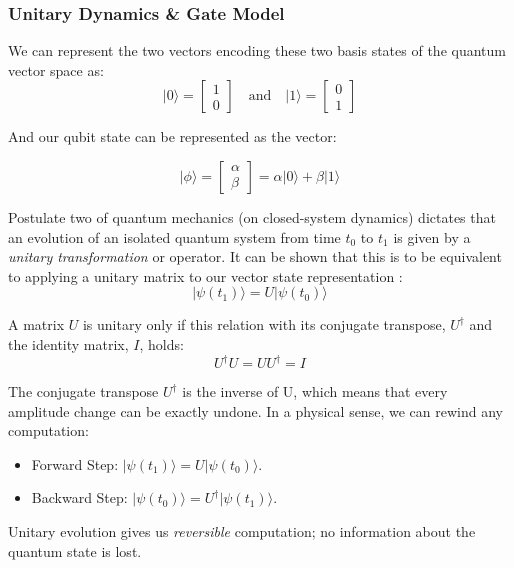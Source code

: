 \subsubsection{Unitary Dynamics \& Gate Model}

We can represent the two vectors encoding these two basis states of the quantum vector space as:
$$\lvert0\rangle = \begin{bmatrix} 1 \\ 0 \end{bmatrix} \quad \textrm{and} \quad \lvert1\rangle = \begin{bmatrix} 0 \\ 1 \end{bmatrix}$$

And our qubit state can be represented as the vector:

$$\lvert\phi\rangle = \begin{bmatrix} \alpha \\ \beta \end{bmatrix} = \alpha\lvert0\rangle + \beta\lvert1\rangle$$

Postulate two of quantum mechanics (on closed-system dynamics) dictates that
an evolution of an isolated quantum system from time $t_0$ to $t_1$ is given by a \emph{unitary transformation} or operator. 
It can be shown that this is to be equivalent to applying a unitary matrix to our vector state representation \cite{Nielsen:2010}:
$$ \lvert \psi(t_1)\rangle = U \lvert \psi(t_0) \rangle$$

A matrix $U$ is unitary only if this relation with its conjugate transpose, $U^{\dagger}$ and the identity matrix, $I$, holds:
$$U^{\dagger} U = U U^{\dagger} = I$$

The conjugate transpose $U^{\dagger}$ is the inverse of U, which means that every amplitude change can be exactly undone.  
In a physical sense, we can rewind any computation:
\begin{itemize}
	\item Forward Step: $ \lvert \psi(t_1)\rangle = U \lvert \psi(t_0) \rangle$.
	\item Backward Step: $ \lvert \psi(t_0)\rangle = U^{\dagger} \lvert \psi(t_1) \rangle$.
\end{itemize}

Unitary evolution gives us \emph{reversible} computation; no information about the quantum state is lost.

